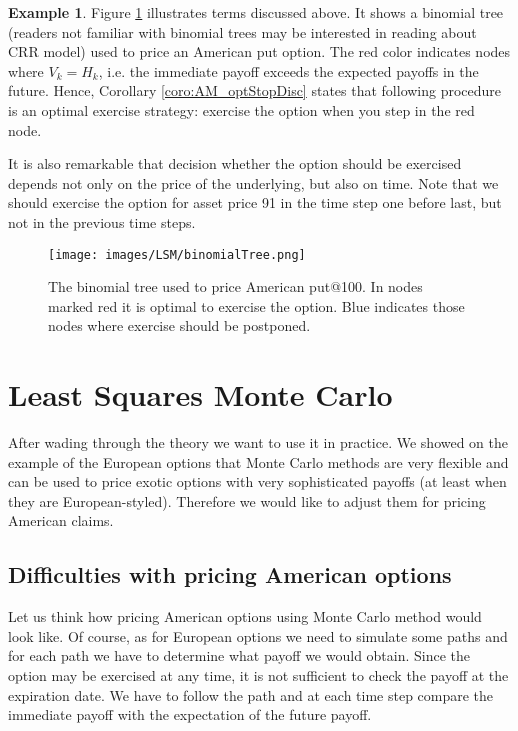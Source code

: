 \documentclass[a4paper,12pt, oneside]{book}
\theoremstyle{definition}
\newtheorem{example}{Example}[chapter]
\theoremstyle{remark}
\begin{document}
\begin{example}
 Figure \ref{fig:binTree} illustrates terms discussed above. It shows a binomial tree (readers not familiar with binomial trees may be interested in reading about CRR model) used to price an American put option. The red color indicates nodes where $V_{k} = H_{k}$, i.e. the immediate payoff exceeds the expected payoffs in the future. Hence, Corollary \ref{coro:AM_optStopDisc} states that following procedure is an optimal exercise strategy: exercise the option when you step in the red node.
 
 It is also remarkable that decision whether the option should be exercised depends not only on the price of the underlying, but also on time. Note that we should exercise the option for asset price 91 in the time step one before last, but not in the previous time steps.
\end{example}

\begin{figure}[!ht]
\centering
 \texttt{[image: images/LSM/binomialTree.png]}
\caption{The binomial tree used to price American put@100. In nodes marked red it is optimal to exercise the option. Blue indicates those nodes where exercise should be postponed. }
\label{fig:binTree}
\end{figure}

\section{Least Squares Monte Carlo}
After wading through the theory we want to use it in practice. We showed on the example of the European options that Monte Carlo methods are very flexible and can be used to price exotic options with very sophisticated payoffs (at least when they are European-styled). Therefore we would like to adjust them for pricing American claims. 

\subsection{Difficulties with pricing American options}

Let us think how pricing American options using Monte Carlo method would look like. Of course, as for European options we need to simulate some paths and for each path we have to determine what payoff we would obtain. Since the option may be exercised at any time, it is not sufficient to check the payoff at the expiration date. We have to follow the path and at each time step compare the immediate payoff with the expectation of the future payoff.
\end{document}
